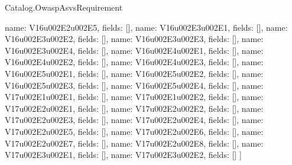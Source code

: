 \begin{lexlean}{Catalog.OwaspAsvsRequirement}
\begin{semanticmodule}
{    {name: V16u002E2u002E5, fields: []},
    {name: V16u002E3u002E1, fields: []},
    {name: V16u002E3u002E2, fields: []},
    {name: V16u002E3u002E3, fields: []},
    {name: V16u002E3u002E4, fields: []},
    {name: V16u002E4u002E1, fields: []},
    {name: V16u002E4u002E2, fields: []},
    {name: V16u002E4u002E3, fields: []},
    {name: V16u002E5u002E1, fields: []},
    {name: V16u002E5u002E2, fields: []},
    {name: V16u002E5u002E3, fields: []},
    {name: V16u002E5u002E4, fields: []},
    {name: V17u002E1u002E1, fields: []},
    {name: V17u002E1u002E2, fields: []},
    {name: V17u002E2u002E1, fields: []},
    {name: V17u002E2u002E2, fields: []},
    {name: V17u002E2u002E3, fields: []},
    {name: V17u002E2u002E4, fields: []},
    {name: V17u002E2u002E5, fields: []},
    {name: V17u002E2u002E6, fields: []},
    {name: V17u002E2u002E7, fields: []},
    {name: V17u002E2u002E8, fields: []},
    {name: V17u002E3u002E1, fields: []},
    {name: V17u002E3u002E2, fields: []}
  ]
}


\end{semanticmodule}
\end{lexlean}
